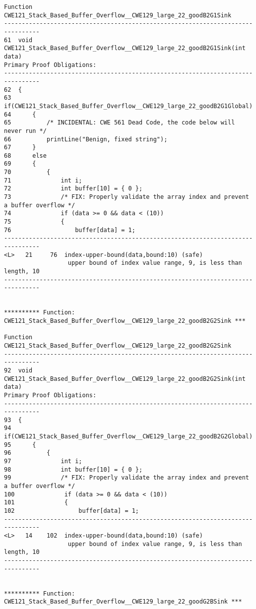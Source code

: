 \documentclass[11pt]{article}
\begin{document}
\begin{scriptsize}
\begin{verbatim}
Function CWE121_Stack_Based_Buffer_Overflow__CWE129_large_22_goodB2G1Sink
--------------------------------------------------------------------------------
61  void CWE121_Stack_Based_Buffer_Overflow__CWE129_large_22_goodB2G1Sink(int data)
Primary Proof Obligations:
--------------------------------------------------------------------------------
62  {
63      if(CWE121_Stack_Based_Buffer_Overflow__CWE129_large_22_goodB2G1Global)
64      {
65          /* INCIDENTAL: CWE 561 Dead Code, the code below will never run */
66          printLine("Benign, fixed string");
67      }
68      else
69      {
70          {
71              int i;
72              int buffer[10] = { 0 };
73              /* FIX: Properly validate the array index and prevent a buffer overflow */
74              if (data >= 0 && data < (10))
75              {
76                  buffer[data] = 1;
--------------------------------------------------------------------------------
<L>   21     76  index-upper-bound(data,bound:10) (safe)
                  upper bound of index value range, 9, is less than length, 10
--------------------------------------------------------------------------------


********** Function: CWE121_Stack_Based_Buffer_Overflow__CWE129_large_22_goodB2G2Sink ***

Function CWE121_Stack_Based_Buffer_Overflow__CWE129_large_22_goodB2G2Sink
--------------------------------------------------------------------------------
92  void CWE121_Stack_Based_Buffer_Overflow__CWE129_large_22_goodB2G2Sink(int data)
Primary Proof Obligations:
--------------------------------------------------------------------------------
93  {
94      if(CWE121_Stack_Based_Buffer_Overflow__CWE129_large_22_goodB2G2Global)
95      {
96          {
97              int i;
98              int buffer[10] = { 0 };
99              /* FIX: Properly validate the array index and prevent a buffer overflow */
100              if (data >= 0 && data < (10))
101              {
102                  buffer[data] = 1;
--------------------------------------------------------------------------------
<L>   14    102  index-upper-bound(data,bound:10) (safe)
                  upper bound of index value range, 9, is less than length, 10
--------------------------------------------------------------------------------


********** Function: CWE121_Stack_Based_Buffer_Overflow__CWE129_large_22_goodG2BSink ***


\end{verbatim}
\end{scriptsize}
\end{document}
